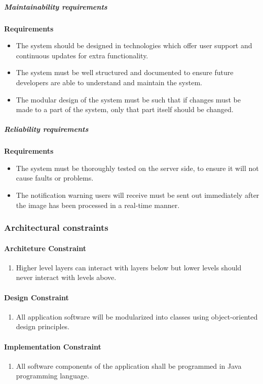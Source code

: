 \documentclass[a4paper,12pt]{report}
\begin{document}
		\subparagraph{Maintainability requirements}
			\hfill \break
			\hfill \break
			\textbf{Requirements}
				\begin{itemize}
					\item The system should be designed in technologies which offer user support and continuous updates for extra functionality.
					\item The system must be well structured and documented to ensure future developers are able to understand and maintain the system.
					\item The modular design of the system must be such that if changes must be made to a part of the system, only that part itself should be changed.
				\end{itemize}
		
		\subparagraph{Reliability requirements}
			\hfill \break
			\hfill \break
			\textbf{Requirements}
				\begin{itemize}
					\item The system must be thoroughly tested on the server side, to ensure it will not cause faults or problems.
					\item The notification warning users will receive must be sent out immediately after the image has been processed in a real-time manner.
				\end{itemize}


\subsubsection{Architectural constraints}
\paragraph{Architeture Constraint}
\begin{enumerate}
	\item Higher level layers can interact with layers below but lower levels should never interact with levels above.
\end{enumerate}
\paragraph{Design Constraint}
\begin{enumerate}
	\item All application software will be modularized into classes using object-oriented design principles.
\end{enumerate}
\paragraph{Implementation Constraint}
\begin{enumerate}
	\item All software components of the application shall be programmed in Java programming language.
\end{enumerate}
\end{document}
